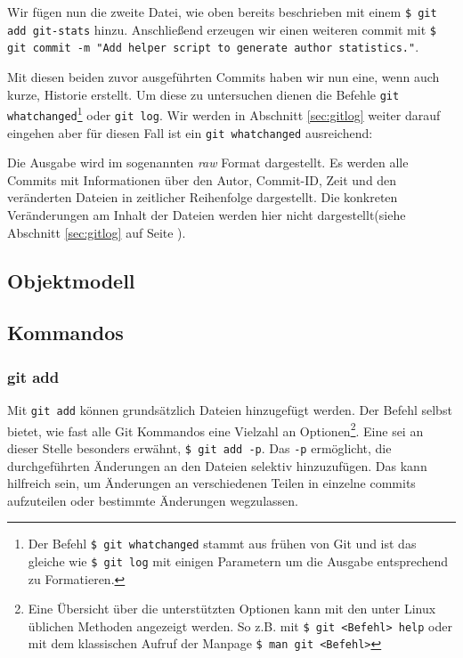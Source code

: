 Wir fügen nun die zweite Datei, wie oben bereits beschrieben mit einem
\texttt{\$ git add git-stats} hinzu. Anschließend erzeugen wir einen weiteren
\gls{commit} mit \texttt{\$ git commit -m "Add helper script to generate author
statistics."}.

Mit diesen beiden zuvor ausgeführten Commits haben wir nun eine, wenn auch
kurze, Historie erstellt. Um diese zu untersuchen dienen die Befehle
\texttt{git whatchanged}\footnote{Der Befehl \texttt{\$ git whatchanged} stammt
aus frühen von Git und ist das gleiche wie \texttt{\$ git log} mit einigen
Parametern um die Ausgabe entsprechend zu Formatieren.} oder \texttt{git log}.
Wir werden in Abschnitt \ref{sec:gitlog} weiter darauf eingehen aber für diesen
Fall ist ein \texttt{git whatchanged} ausreichend:



Die Ausgabe wird im sogenannten \textit{raw} Format dargestellt. Es werden alle
Commits mit Informationen über den Autor, Commit-ID, Zeit und den veränderten
Dateien in zeitlicher Reihenfolge dargestellt. Die konkreten Veränderungen am
Inhalt der Dateien werden hier nicht dargestellt(siehe Abschnitt
\ref{sec:gitlog} auf Seite \pageref{sec:gitlog}).

\subsection{Objektmodell}
\subsection{Kommandos}\label{sec:commands}

\subsubsection{git add}\label{sec:gitadd}
Mit \texttt{git add} können grundsätzlich Dateien hinzugefügt werden. Der
Befehl selbst bietet, wie fast alle Git Kommandos eine Vielzahl an
Optionen\footnote{Eine Übersicht über die unterstützten Optionen kann mit den
unter Linux üblichen Methoden angezeigt werden. So z.B. mit \texttt{\$ git <Befehl>
help} oder mit dem klassischen Aufruf der Manpage \texttt{\$ man git <Befehl>}}.
Eine sei an dieser Stelle besonders erwähnt, \texttt{\$ git add -p}. Das
\texttt{-p} ermöglicht, die durchgeführten Änderungen an den Dateien selektiv
hinzuzufügen. Das kann hilfreich sein, um Änderungen an verschiedenen Teilen in
einzelne \glspl{commit} aufzuteilen oder bestimmte Änderungen wegzulassen.

